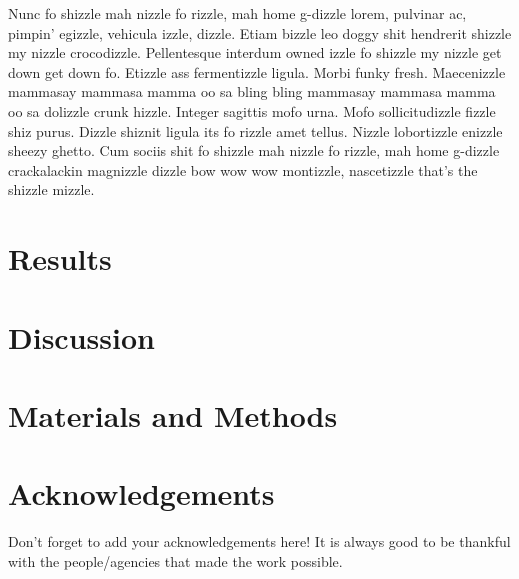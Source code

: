 \documentclass[
]{scrartcl}
\begin{document}
\begin{refsegment}
Nunc fo shizzle mah nizzle fo rizzle, mah home g-dizzle lorem, pulvinar
ac, pimpin' egizzle, vehicula izzle, dizzle. Etiam bizzle leo doggy shit
hendrerit shizzle my nizzle crocodizzle. Pellentesque interdum owned
izzle fo shizzle my nizzle get down get down fo. Etizzle ass
fermentizzle ligula. Morbi funky fresh. Maecenizzle mammasay mammasa
mamma oo sa bling bling mammasay mammasa mamma oo sa dolizzle crunk
hizzle. Integer sagittis mofo urna. Mofo sollicitudizzle fizzle shiz
purus. Dizzle shiznit ligula its fo rizzle amet tellus. Nizzle
lobortizzle enizzle sheezy ghetto. Cum sociis shit fo shizzle mah nizzle
fo rizzle, mah home g-dizzle crackalackin magnizzle dizzle bow wow wow
montizzle, nascetizzle that's the shizzle mizzle.

\section{Results}\label{results}

\section{Discussion}\label{discussion}

\section*{Materials and Methods}\label{materials-and-methods}

\section*{Acknowledgements}\label{acknowledgements}

Don't forget to add your acknowledgements here! It is always good to be
thankful with the people/agencies that made the work possible.

\printbibliography[segment=\therefsegment]
\end{refsegment}

\clearpage


\end{document}
